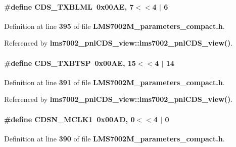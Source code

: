 \paragraph[{C\+D\+S\+\_\+\+T\+X\+B\+L\+ML}]{\setlength{\rightskip}{0pt plus 5cm}\#define C\+D\+S\+\_\+\+T\+X\+B\+L\+ML~0x00\+A\+E, 7$<$$<$4 $\vert$  6}\label{LMS7002M__parameters__compact_8h_a6ac68e1902d9767f28b39b1a3ec3db1c}


Definition at line {\bf 395} of file {\bf L\+M\+S7002\+M\+\_\+parameters\+\_\+compact.\+h}.



Referenced by {\bf lms7002\+\_\+pnl\+C\+D\+S\+\_\+view\+::lms7002\+\_\+pnl\+C\+D\+S\+\_\+view()}.

\paragraph[{C\+D\+S\+\_\+\+T\+X\+B\+T\+SP}]{\setlength{\rightskip}{0pt plus 5cm}\#define C\+D\+S\+\_\+\+T\+X\+B\+T\+SP~0x00\+A\+E, 15$<$$<$4 $\vert$  14}\label{LMS7002M__parameters__compact_8h_add3781fb3d7c2bbb369c1c19eddd0452}


Definition at line {\bf 391} of file {\bf L\+M\+S7002\+M\+\_\+parameters\+\_\+compact.\+h}.



Referenced by {\bf lms7002\+\_\+pnl\+C\+D\+S\+\_\+view\+::lms7002\+\_\+pnl\+C\+D\+S\+\_\+view()}.

\paragraph[{C\+D\+S\+N\+\_\+\+M\+C\+L\+K1}]{\setlength{\rightskip}{0pt plus 5cm}\#define C\+D\+S\+N\+\_\+\+M\+C\+L\+K1~0x00\+A\+D, 0$<$$<$4 $\vert$  0}\label{LMS7002M__parameters__compact_8h_a73f44c92c97bd81346ede7b5b37c0232}


Definition at line {\bf 390} of file {\bf L\+M\+S7002\+M\+\_\+parameters\+\_\+compact.\+h}.



